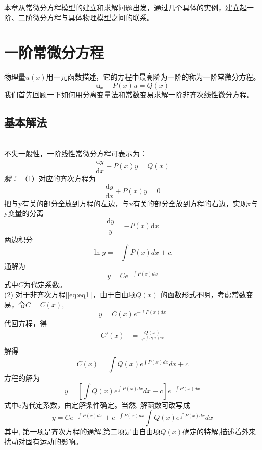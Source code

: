 本章从常微分方程模型的建立和求解问题出发，通过几个具体的实例，建立起一阶、二阶微分方程与具体物理模型之间的联系。

\section{一阶常微分方程}

物理量$u(x)$用一元函数描述，它的方程中最高阶为一阶的称为一阶常微分方程。
\begin{equation}
	\boldsymbol{u}_{x} +P (x) u=Q(x)
 \end{equation}
我们首先回顾一下如何用分离变量法和常数变易求解一阶非齐次线性微分方程。\\

\subsection{基本解法} ~\\

不失一般性，一阶线性常微分方程可表示为：
\begin{equation}\label{eq:eq1}
	\frac{\mathrm{d}y}{\mathrm{d}x}+P (x) y=Q(x)
 \end{equation}
\emph{解：}
 （1）对应的齐次方程为
\begin{equation}
	\frac{\mathrm{d}y}{\mathrm{d}x}+P (x) y=0
 \end{equation}
把与y有关的部分全放到方程的左边，与x有关的部分全放到方程的右边，实现x与y变量的分离
\begin{equation*}
	\frac{\mathrm{d}y}{y}=-P(x){\mathrm{d}x}
\end{equation*}
两边积分
\begin{equation*}
	\ln y=-\int P(x)dx + c.
\end{equation*}
通解为
\begin{equation}\label{eq:anseq1}
	y=Ce^{-\int P(x)dx}
\end{equation}
式中$C$为代定系数。\\
(2) 对于非齐次方程[\ref{eq:eq1}]，由于自由项$ Q(x) $ 的函数形式不明，考虑常数变易，令$C=C(x)$, 
\begin{equation*}
	y=C(x)e^{-\int P(x)dx}
\end{equation*}
代回方程，得
\[\begin{aligned}
	C'(x)&=\frac{Q(x)}{e^{-\int P(x)dx}} \\
\end{aligned}\]
解得
$$
C(x)=\int Q(x){e^{\int P(x)dx}} dx +c  
$$ 
方程的解为
\begin{equation*}
	y=\left[\int Q(x){e^{\int P(x)dx}} dx +c\right]e^{-\int P(x)dx}
\end{equation*}
式中c为代定系数，由定解条件确定。当然, 解函数可改写成
\begin{equation*}
	y=Ce^{-\int P(x)dx} + e^{-\int P(x)dx}\int Q(x){e^{\int P(x)dx}} dx 
\end{equation*}
其中, 第一项是齐次方程的通解,第二项是由自由项$Q(x)$确定的特解,描述着外来扰动对固有运动的影响。\\

